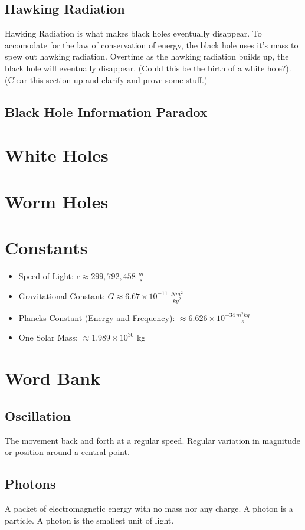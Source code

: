 \documentclass{article}
\begin{document}
\subsection{Hawking Radiation}
Hawking Radiation is what makes black holes eventually disappear. To accomodate for the law of conservation of energy, the black hole uses it's mass to spew out hawking radiation. Overtime as the hawking radiation builds up, the black hole will eventually disappear. (Could this be the birth of a white hole?). (Clear this section up and clarify and prove some stuff.)

\subsection{Black Hole Information Paradox}




\section{White Holes}




\section{Worm Holes}




\section{Constants}\label{sec:constants}
\begin{itemize}
    \item Speed of Light: $c \approx 299,792,458\;\frac{m}{s}$
    \item Gravitational Constant: $G \approx 6.67 \times 10^{-11}\;\frac{Nm^2}{kg^2}$
    \item Plancks Constant (Energy and Frequency): $\approx 6.626\times 10^{-34}\frac{m^2kg}{s}$
    \item One Solar Mass: $\approx 1.989 \times 10^{30}$ kg
\end{itemize}

\section{Word Bank}
\subsection{Oscillation}\label{sec:oscillation}
The movement back and forth at a regular speed. Regular variation in magnitude or position around a central point.

\subsection{Photons}\label{sec:photons}
A packet of electromagnetic energy with no mass nor any charge. A photon is a particle. A photon is the smallest unit of light.
\end{document}
